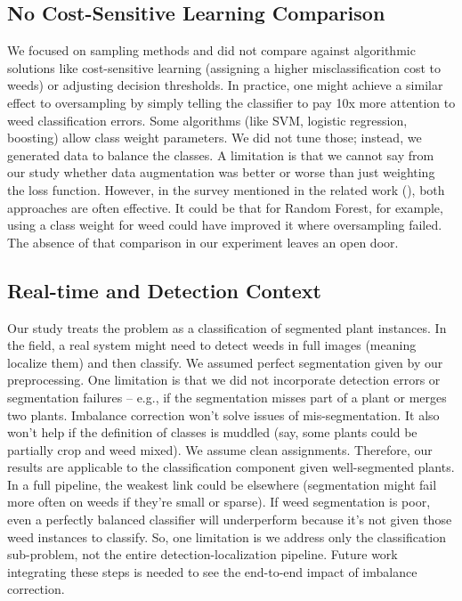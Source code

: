 \documentclass[agriengineering,article,submit,pdftex,moreauthors]{Definitions/mdpi}
\begin{document}
\subsection{No Cost-Sensitive Learning Comparison}
We focused on sampling methods and did not compare against algorithmic solutions like cost-sensitive learning (assigning a higher misclassification cost to weeds) or adjusting decision thresholds. In practice, one might achieve a similar effect to oversampling by simply telling the classifier to pay 10x more attention to weed classification errors. Some algorithms (like SVM, logistic regression, boosting) allow class weight parameters. We did not tune those; instead, we generated data to balance the classes. A limitation is that we cannot say from our study whether data augmentation was better or worse than just weighting the loss function. However, in the survey mentioned in the related work (\cite{Burks2000-dt}), both approaches are often effective. It could be that for Random Forest, for example, using a class weight for weed could have improved it where oversampling failed. The absence of that comparison in our experiment leaves an open door.

\subsection{Real-time and Detection Context}
Our study treats the problem as a classification of segmented plant instances. In the field, a real system might need to detect weeds in full images (meaning localize them) and then classify. We assumed perfect segmentation given by our preprocessing. One limitation is that we did not incorporate detection errors or segmentation failures – e.g., if the segmentation misses part of a plant or merges two plants. Imbalance correction won’t solve issues of mis-segmentation. It also won’t help if the definition of classes is muddled (say, some plants could be partially crop and weed mixed). We assume clean assignments. Therefore, our results are applicable to the classification component given well-segmented plants. In a full pipeline, the weakest link could be elsewhere (segmentation might fail more often on weeds if they’re small or sparse). If weed segmentation is poor, even a perfectly balanced classifier will underperform because it’s not given those weed instances to classify. So, one limitation is we address only the classification sub-problem, not the entire detection-localization pipeline. Future work integrating these steps is needed to see the end-to-end impact of imbalance correction.
\end{document}
